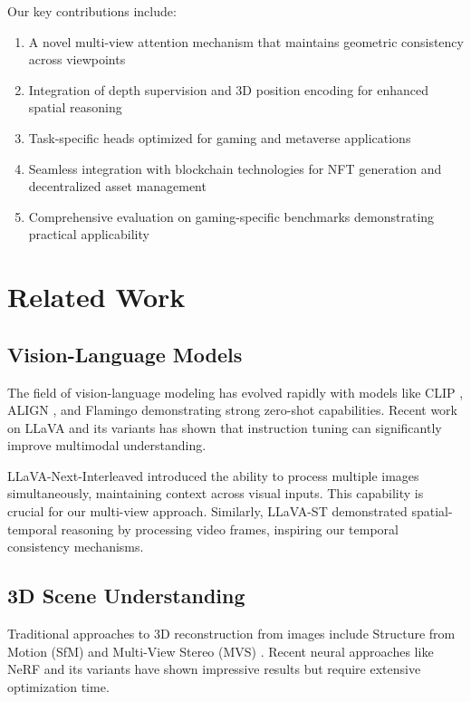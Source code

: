 \documentclass[11pt,a4paper]{article}
\begin{document}
Our key contributions include:

\begin{enumerate}
\item A novel multi-view attention mechanism that maintains geometric consistency across viewpoints
\item Integration of depth supervision and 3D position encoding for enhanced spatial reasoning
\item Task-specific heads optimized for gaming and metaverse applications
\item Seamless integration with blockchain technologies for NFT generation and decentralized asset management
\item Comprehensive evaluation on gaming-specific benchmarks demonstrating practical applicability
\end{enumerate}

\section{Related Work}

\subsection{Vision-Language Models}

The field of vision-language modeling has evolved rapidly with models like CLIP \cite{clip}, ALIGN \cite{align}, and Flamingo \cite{flamingo} demonstrating strong zero-shot capabilities. Recent work on LLaVA \cite{llava} and its variants has shown that instruction tuning can significantly improve multimodal understanding.

LLaVA-Next-Interleaved \cite{llava-next} introduced the ability to process multiple images simultaneously, maintaining context across visual inputs. This capability is crucial for our multi-view approach. Similarly, LLaVA-ST \cite{llava-st} demonstrated spatial-temporal reasoning by processing video frames, inspiring our temporal consistency mechanisms.

\subsection{3D Scene Understanding}

Traditional approaches to 3D reconstruction from images include Structure from Motion (SfM) \cite{sfm} and Multi-View Stereo (MVS) \cite{mvs}. Recent neural approaches like NeRF \cite{nerf} and its variants have shown impressive results but require extensive optimization time.
\end{document}
